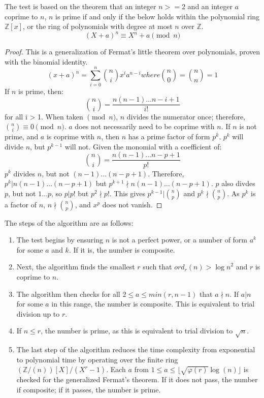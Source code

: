 \documentclass{article}
\begin{document}
The test is based on the theorem that an integer $n >= 2$ and an integer $a$ coprime to $n$, $n$ is prime if and only if the below holds within the polynomial ring $\mathbb{Z}[x]$, or the ring of polynomials with degree at most $n$ over $\mathbb{Z}$.
\[
    (X + a)^n \equiv X^n + a \pmod{n}
\]

\begin{proof} %
    This is a generalization of Fermat's little theorem over polynomials, proven with the binomial identity.
    \[
        (x + a)^n = \sum_{i=0}^{n} \binom{n}{i} x^i a^{n - i} where \binom{n}{0} = \binom{n}{n} = 1
    \]
    If $n$ is prime, then:
    \[
        \binom{n}{i} = \frac{n (n - 1) \ldots{} {n - i + 1}}{i!}
    \]
    for all i > 1. When taken $\pmod{n}$, $n$ divides the numerator once; therefore, $\binom{n}{i} \equiv 0 \pmod{n}$. $a$ does not necessarily need to be coprime with $n$.
    If $n$ is not prime, and $a$ is coprime with $n$, then $n$ has a prime factor of form $p^k$. $p^k$ will divide $n$, but $p^{k - 1}$ will not. Given the monomial with a coefficient of:
    \[
        \binom{n}{i} = \frac{n (n - 1) \ldots{} {n - p + 1}}{p!}
    \]
    $p^k$ divides $n$, but not $(n - 1) \ldots{} (n - p + 1)$. Therefore, $p^k \vert n (n - 1) \ldots{} (n - p + 1)$ but $p^{k + 1} \nmid n (n - 1) \ldots{} (n - p + 1)$. $p$ also divdes $p$, but not $1 \ldots p$, so $p \vert p!$ but $p^2 \nmid p!$. This gives $p^{k - 1} \vert \binom{n}{p}$ and $p^k \nmid \binom{n}{p}$. As $p^k$ is a factor of $n$, $n \nmid \binom{n}{p}$, and $x^p$ does not vanish.
\end{proof}

The steps of the algorithm are as follows:
\begin{enumerate}
    \item The test begins by ensuring $n$ is not a perfect power, or a number of form $a^k$ for some $a$ and $k$. If it is, the number is composite.
    \item Next, the algorithm finds the smallest $r$ such that $ord_r(n) > {\log{n}}^2$ and $r$ is coprime to $n$.
    \item The algorithm then checks for all $2 \leq a \leq min(r, n - 1)$ that $a \nmid n$. If $a \vert n$ for some $a$ in this range, the number is composite. This is equivalent to trial division up to $r$.
    \item If $n \leq r$, the number is prime, as this is equivalent to trial division to $\sqrt{n}$.
    \item The last step of the algorithm reduces the time complexity from exponential to polynomial time by operating over the finite ring $(\mathbb{Z}/(n))[X] / (X^r - 1)$. Each $a$ from $1 \leq a \leq \lfloor \sqrt{\varphi(r)}\log(n) \rfloor$ is checked for the generalized Fermat's theorem. If it does not pass, the number if composite; if it passes, the number is prime.
\end{enumerate}
\end{document}
